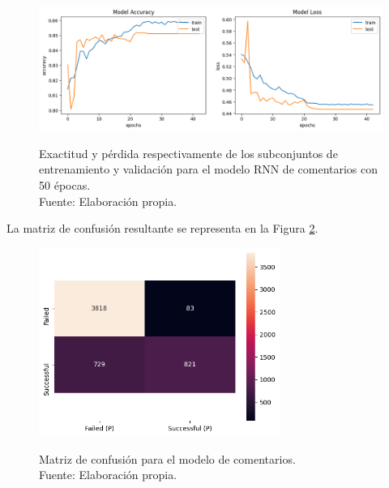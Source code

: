 \begin{figure}[!ht]
	\begin{center}
		\includegraphics[width=1\textwidth]{5/figures/comments_model_acc_loss.png}
		\caption[Exactitud y pérdida respectivamente de los subconjuntos de entrenamiento y validación para el modelo RNN de comentarios con 50 épocas]{Exactitud y pérdida respectivamente de los subconjuntos de entrenamiento y validación para el modelo RNN de comentarios con 50 épocas.\\
		Fuente: Elaboración propia.}
		\vspace{-1cm}
		\label{5:fig7}
	\end{center}
\end{figure}

\newpage
La matriz de confusión resultante se representa en la Figura \ref{5:fig8}.
\begin{figure}[!ht]
	\begin{center}
		\includegraphics[width=0.70\textwidth]{5/figures/comments_confusion_matrix.png}
		\caption[Matriz de confusión para el modelo de comentarios]{Matriz de confusión para el modelo de comentarios.\\
		Fuente: Elaboración propia.}
		\vspace{-0.8cm}
		\label{5:fig8}
	\end{center}
\end{figure}

